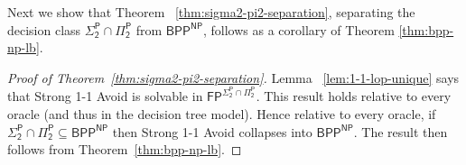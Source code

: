 \documentclass[11pt]{article}
\newtheorem{corollary}{Corollary}
\begin{document}

Next we show that Theorem ~\ref{thm:sigma2-pi2-separation}, separating the decision class $\mathsf{\Sigma_2^P \cap \Pi_2^P}$ from $\mathsf{BPP^{NP}}$, follows as a corollary of Theorem \ref{thm:bpp-np-lb}.



\begin{proof}[Proof of Theorem~\ref{thm:sigma2-pi2-separation}]
Lemma ~\ref{lem:1-1-lop-unique} says that Strong 1-1 Avoid is solvable in $\mathsf{FP^{\Sigma_2^P \cap \Pi_2^P}}$. This result holds relative to every oracle (and thus in the decision tree model). Hence relative to every oracle, if $\mathsf{\Sigma_2^P} \cap \mathsf{\Pi_2^P} \subseteq \mathsf{BPP^{NP}}$ then Strong 1-1 Avoid collapses into $\mathsf{BPP^{NP}}$. The result then follows from Theorem~\ref{thm:bpp-np-lb}.
\end{proof}
\end{document}
